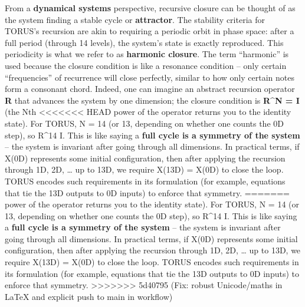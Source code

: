 \documentclass[]{article}
\begin{document}
{From a \textbf{dynamical systems} perspective, recursive closure can be
thought of as the system finding a stable cycle or \textbf{attractor}.
The stability criteria for TORUS's recursion are akin to requiring a
periodic orbit in phase space: after a full period (through 14 levels),
the system's state is exactly reproduced. This periodicity is what we
refer to as \textbf{harmonic closure}. The term ``harmonic'' is used
because the closure condition is like a resonance condition -- only
certain ``frequencies'' of recurrence will close perfectly, similar to
how only certain notes form a consonant chord. Indeed, one can imagine
an abstract recursion operator \textbf{R} that advances the system by
one dimension; the closure condition is \textbf{R\^{}N = I} (the Nth
<<<<<<< HEAD
power of the operator returns you to the identity state)\hspace{0pt}.
For TORUS, N = 14 (or 13, depending on whether one counts the 0D step),
so R\^{}14 \approx I. This is like saying a \textbf{full cycle is a symmetry
of the system} -- the system is invariant after going through all
dimensions. In practical terms, if X(0D) represents some initial
configuration, then after applying the recursion through 1D, 2D,
\ldots{} up to 13D, we require X(13D) = X(0D) to close the
loop\hspace{0pt}. TORUS encodes such requirements in its formulation
(for example, equations that tie the 13D outputs to 0D inputs) to
enforce that symmetry.
=======
power of the operator returns you to the identity state)​. For TORUS, N
= 14 (or 13, depending on whether one counts the 0D step), so R\^{}14 \approx
I. This is like saying a \textbf{full cycle is a symmetry of the system}
-- the system is invariant after going through all dimensions. In
practical terms, if X(0D) represents some initial configuration, then
after applying the recursion through 1D, 2D, \ldots{} up to 13D, we
require X(13D) = X(0D) to close the loop​. TORUS encodes such
requirements in its formulation (for example, equations that tie the 13D
outputs to 0D inputs) to enforce that symmetry.
>>>>>>> 5d40795 (Fix: robust Unicode/maths in LaTeX and explicit push to main in workflow)

}
\end{document}
